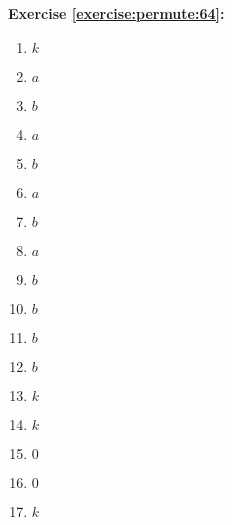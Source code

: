 \noindent\textbf{Exercise \ref{exercise:permute:64}:}
%
\begin{multicols}{5}
\begin{enumerate}
\item
$k$

\item
$a$

\item
$b$

\item
$a$

\item
$b$

\item
$a$

\item
$b$

\item
$a$

\item
$b$

\item
$b$

\item
$b$

\item
$b$

\item
$k$

\item
$k$

\item
$0$

\item
$0$

\item
$k$
\end{enumerate}
\end{multicols}

